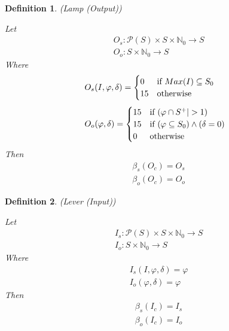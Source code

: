 \documentclass{article}
\newtheorem{defn}{Definition}[section]
\begin{document}
\begin{defn} (Lamp (Output))
	
	Let
	\begin{align}
		& O_{s} : \mathcal{P} (S) \times S \times \mathbb{N}_{0} \rightarrow S \\
		& O_{o} : S \times \mathbb{N}_{0} \rightarrow S
	\end{align}
	Where
	\begin{align}
		&O_{s}(I, \varphi, \delta) = 
		\begin{cases}
			0 & \text{if } Max(I) \subseteq S_{0} \\
			15 & \text{otherwise}
		\end{cases} \\[\jot]
		&O_{o}(\varphi, \delta) = 
		\begin{cases}
			15 & \text{if } (\varphi \cap S^+| > 1) \\
			15 & \text{if } (\varphi \subseteq S_{0}) \land (\delta = 0) \\
			0 & \text{otherwise}
		\end{cases}
	\end{align}
	Then
	\begin{align}
		& \beta_{s}(O_{c}) = O_{s} \\
		& \beta_{o}(O_{c}) = O_{o}
	\end{align}
\end{defn}

\begin{defn} (Lever (Input))
	
	Let
	\begin{align}
		& I_{s} : \mathcal{P} (S) \times S \times \mathbb{N}_{0} \rightarrow S \\
		& I_{o} : S \times \mathbb{N}_{0} \rightarrow S
	\end{align}
	Where
	\begin{align}
		& I_{s}(I, \varphi, \delta) = \varphi \\
		& I_{o}(\varphi, \delta) = \varphi
	\end{align}
	Then
	\begin{align}
		& \beta_{s}(I_{c}) = I_{s} \\
		& \beta_{o}(I_{c}) = I_{o}
	\end{align}
\end{defn}
\end{document}

